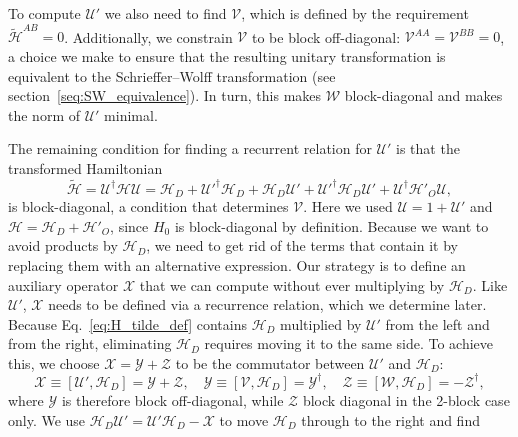 To compute $\mathcal{U}'$ we also need to find $\mathcal{V}$, which is defined by the requirement $\tilde{\mathcal{H}}^{AB} = 0$.
Additionally, we constrain $\mathcal{V}$ to be block off-diagonal: $\mathcal{V}^{AA} = \mathcal{V}^{BB} = 0$, a choice we make to ensure that the resulting unitary transformation is equivalent to the Schrieffer--Wolff transformation (see section~\ref{seq:SW_equivalence}).
In turn, this makes $\mathcal{W}$ block-diagonal and makes the norm of $\mathcal{U}'$ minimal.

The remaining condition for finding a recurrent relation for $\mathcal{U}'$ is that the transformed Hamiltonian
%
\begin{equation}
\label{eq:H_tilde_def}
\tilde{\mathcal{H}} = \mathcal{U}^\dagger \mathcal{H} \mathcal{U} = \mathcal{H}_{D} +
\mathcal{U}'^\dagger \mathcal{H}_{D} + \mathcal{H}_{D} \mathcal{U}' + \mathcal{U}'^\dagger \mathcal{H}_{D}
\mathcal{U}' + \mathcal{U}^\dagger\mathcal{H}'_{O}\mathcal{U},
\end{equation}
%
is block-diagonal, a condition that determines $\mathcal{V}$.
Here we used $\mathcal{U}=1+\mathcal{U}'$ and $\mathcal{H} = \mathcal{H}_{D} + \mathcal{H}'_{O}$, since $H_0$ is block-diagonal by definition.
Because we want to avoid products by $\mathcal{H}_{D}$, we need to get rid of the terms that contain it by replacing them with an alternative expression.
Our strategy is to define an auxiliary operator $\mathcal{X}$ that we can compute without ever multiplying by $\mathcal{H}_{D}$.
Like $\mathcal{U}'$, $\mathcal{X}$ needs to be defined via a recurrence relation, which we determine later.
Because Eq.~\eqref{eq:H_tilde_def} contains $\mathcal{H}_{D}$ multiplied by $\mathcal{U}'$ from the left and from the right, eliminating $\mathcal{H}_{D}$ requires moving it to the same side.
To achieve this, we choose $\mathcal{X}=\mathcal{Y}+\mathcal{Z}$ to be the commutator between $\mathcal{U}'$ and $\mathcal{H}_{D}$:
%
\begin{equation}
\label{eq:XYZ}
\mathcal{X} \equiv [\mathcal{U}', \mathcal{H}_{D}] = \mathcal{Y} + \mathcal{Z}, \quad
\mathcal{Y} \equiv [\mathcal{V}, \mathcal{H}_{D}] = \mathcal{Y}^\dagger,\quad
\mathcal{Z} \equiv [\mathcal{W}, \mathcal{H}_{D}] = -\mathcal{Z}^\dagger,
\end{equation}
%
where $\mathcal{Y}$ is therefore block off-diagonal, while $\mathcal{Z}$ block diagonal in the 2-block case only.
We use $\mathcal{H}_{D} \mathcal{U}' = \mathcal{U}' \mathcal{H}_{D} -\mathcal{X}$ to move $\mathcal{H}_{D}$ through to the right and find
